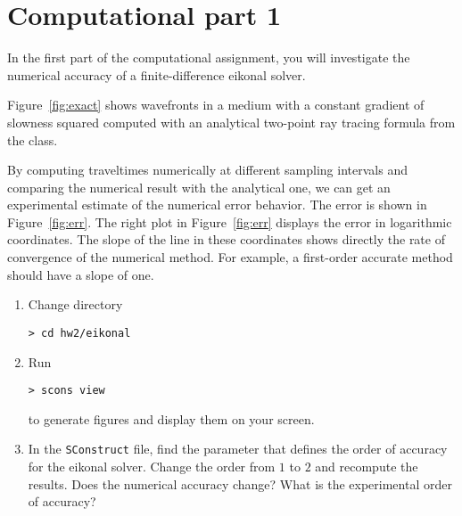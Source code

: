 \section{Computational part 1}

In the first part of the computational assignment, you will
     investigate the numerical accuracy of a finite-difference eikonal solver.


\lstset{language=python,numbers=left,numberstyle=\tiny,showstringspaces=false}


  Figure~\ref{fig:exact} shows wavefronts in a medium with a constant
  gradient of slowness squared computed with an analytical two-point
  ray tracing formula from the class.
 

  By computing traveltimes numerically at different sampling intervals
  and comparing the numerical result with the analytical one, we can
  get an experimental estimate of the numerical error behavior. The
  error is shown in Figure~\ref{fig:err}. The right plot in
  Figure~\ref{fig:err} displays the error in logarithmic coordinates. The
  slope of the line in these coordinates shows directly the rate of
  convergence of the numerical method. For example, a first-order
  accurate method should have a slope of one.


  \begin{enumerate}
  \item Change directory
\begin{verbatim}
> cd hw2/eikonal
\end{verbatim}
  \item Run
\begin{verbatim}
> scons view
\end{verbatim}
    to generate figures and display them on your screen.  

  \item In the \texttt{SConstruct} file, find the parameter that
    defines the order of accuracy for the eikonal solver. Change the
    order from $1$ to $2$ and recompute the results. Does the
    numerical accuracy change? What is the experimental order of
    accuracy? 
  \end{enumerate}


